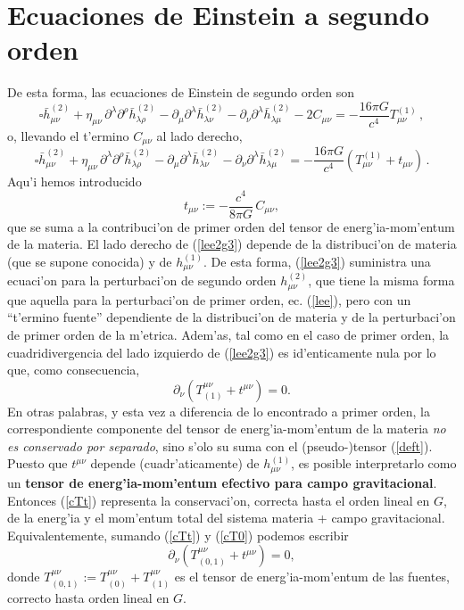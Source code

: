 \section{Ecuaciones de Einstein a segundo orden}
De esta forma, las ecuaciones de Einstein de segundo orden son
\begin{equation}\label{lee2g2}
\square \bar{h}^{(2)}_{\mu\nu}
+\eta_{\mu\nu}\, \partial^\lambda\partial^\rho\bar{h}^{(2)}_{\lambda\rho}-
\partial_\mu\partial^\lambda\bar{h}^{(2)}_{\lambda\nu}
- \partial_\nu\partial^\lambda \bar{h}^{(2)}_{\lambda\mu} -2C_{\mu\nu}=
-\frac{16\pi G}{c^4}T_{\mu\nu}^{(1)} \, ,
\end{equation}
o, llevando el t'ermino $C_{\mu\nu}$ al lado derecho,
\begin{equation}\label{lee2g3}
\boxed{\square \bar{h}^{(2)}_{\mu\nu}
+\eta_{\mu\nu}\, \partial^\lambda\partial^\rho\bar{h}^{(2)}_{\lambda\rho}-
\partial_\mu\partial^\lambda\bar{h}^{(2)}_{\lambda\nu}
- \partial_\nu\partial^\lambda \bar{h}^{(2)}_{\lambda\mu} =
-\frac{16\pi G}{c^4}\left(T_{\mu\nu}^{(1)}+t_{\mu\nu} \right)\, .}
\end{equation}
Aqu'i hemos introducido
\begin{equation}
t_{\mu\nu}:=-\frac{c^4}{8\pi G}\,C_{\mu\nu}, \label{deft}
\end{equation}
que se suma a la contribuci'on de primer orden del tensor de energ'ia-mom'entum de la materia. El lado derecho de (\ref{lee2g3}) depende de la distribuci'on de materia (que se supone conocida) y de $h^{(1)}_{\mu\nu}$. De esta forma, (\ref{lee2g3}) suministra una ecuaci'on para la perturbaci'on de segundo orden $h^{(2)}_{\mu\nu}$, que tiene la misma forma que aquella para la perturbaci'on de primer orden, ec. (\ref{lee}), pero con un ``t'ermino fuente'' dependiente de la distribuci'on de materia y de la perturbaci'on de primer orden de la m'etrica. Adem'as, tal como en el caso de primer orden, la cuadridivergencia del lado izquierdo de (\ref{lee2g3}) es id'enticamente nula por lo que, como consecuencia,
\begin{equation}
\partial_\nu\left(T^{\mu\nu}_{(1)}+t^{\mu\nu} \right)=0. \label{cTt}
\end{equation}
En otras palabras, y esta vez a diferencia de lo encontrado a primer orden, la correspondiente componente del tensor de energ'ia-mom'entum de la materia \textit{no es conservado por separado}, sino s'olo su suma con el (pseudo-)tensor (\ref{deft}). Puesto que $t^{\mu\nu}$ depende (cuadr'aticamente) de $h^{(1)}_{\mu\nu}$, es posible interpretarlo como un \textbf{tensor de energ'ia-mom'entum efectivo para campo gravitacional}. Entonces (\ref{cTt}) representa la conservaci'on, correcta hasta el orden lineal en $G$, de la energ'ia y el mom'entum total del sistema materia + campo gravitacional. Equivalentemente, sumando (\ref{cTt}) y (\ref{cT0}) podemos escribir
\begin{equation}
\boxed{\partial_\nu\left(T^{\mu\nu}_{(0,1)}+t^{\mu\nu} \right)=0,} \label{cT01t}
\end{equation}
donde $T^{\mu\nu}_{(0,1)}:=T^{\mu\nu}_{(0)}+T^{\mu\nu}_{(1)}$ es el tensor de energ'ia-mom'entum de las fuentes, correcto hasta orden lineal en $G$.

